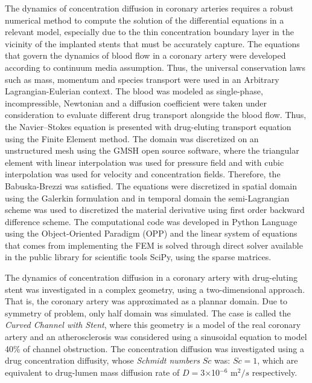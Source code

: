 \documentclass[10pt,fleqn,a4paper,twoside]{article}
\begin{document}
\medskip
The dynamics of concentration diffusion in coronary arteries 
requires a robust numerical method to compute the solution 
of the differential equations in a relevant model,
especially due to the thin concentration boundary layer 
in the vicinity of the implanted
stents that must be accurately capture. 
The equations that govern the dynamics of blood
flow in a coronary artery were developed according 
to continuum media assumption. Thus,
the universal conservation laws such as mass, momentum 
and species transport were used
in an Arbitrary Lagrangian-Eulerian context. 
The blood was modeled as single-phase, incompressible, Newtonian
and a diffusion coefficient were taken under consideration 
to evaluate different drug
transport alongside the blood flow. 
Thus, the Navier--Stokes equation is presented 
with drug-eluting transport equation using
the Finite Element method. 
The domain was discretized on an unstructured mesh using the
GMSH open source software, 
where the triangular element with linear interpolation
was used for pressure field and with cubic interpolation
was used for velocity and concentration fields.
Therefore, the Babuska-Brezzi \cite{babuska1971}\cite{brezzi1974} 
was
satisfied. 
The equations were discretized in spatial domain using the Galerkin formulation
and in temporal domain the semi-Lagrangian scheme 
was used to discretized the material
derivative using first order backward difference scheme. 
The computational code was
developed in Python Language using the Object-Oriented Paradigm (OPP) 
and the linear
system of equations that comes from implementing the FEM is 
solved through direct solver available in the public 
library for scientific tools SciPy, using the sparse matrices.


\smallskip
The dynamics of
concentration diffusion in a coronary artery with 
drug-eluting stent was investigated in
a complex geometry, using a two-dimensional approach. 
That is, the coronary artery
was approximated as a plannar domain. 
Due to symmetry of problem, only half domain
was simulated. 
The case is called the \textit{Curved Channel with Stent}, 
where this geometry is a model of the real coronary artery and 
an atherosclerosis was considered using a sinusoidal
equation to model 40\% of channel obstruction.
The concentration diffusion was investigated using 
a drug concentration diffusity, 
whose \textit{Schmidt numbers} $Sc$
was: $Sc = 1$, which are equivalent to drug-lumen 
mass diffusion rate of
$D = 3$$\times$10$^{−6}$ m$^{2}/s$ respectively.
\end{document}
